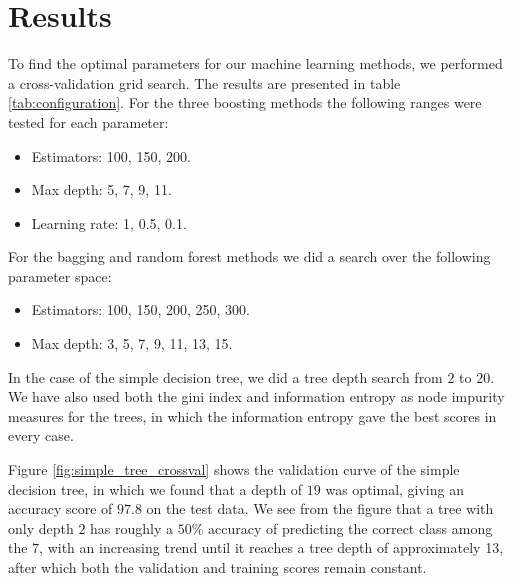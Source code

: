 \section{Results}\label{sec:Results}
To find the optimal parameters for our machine learning methods, we performed a cross-validation grid search. The results are presented in table \ref{tab:configuration}. For the three boosting methods the following ranges were tested for each parameter:

\begin{itemize}
    \item Estimators: 100, 150, 200.
    \item Max depth: 5, 7, 9, 11.
    \item Learning rate: 1, 0.5, 0.1.
\end{itemize}

For the bagging and random forest methods we did a search over the following parameter space:

\begin{itemize}
    \item Estimators: 100, 150, 200, 250, 300.
    \item Max depth: 3, 5, 7, 9, 11, 13, 15.
\end{itemize}

In the case of the simple decision tree, we did a tree depth search from $2$ to $20$. We have also used both the gini index and information entropy as node impurity measures for the trees, in which the information entropy gave the best scores in every case. 

Figure \ref{fig:simple_tree_crossval} shows the validation curve of the simple decision tree, in which we found that a depth of $19$ was optimal, giving an accuracy score of $97.8$ on the test data. We see from the figure that a tree with only depth $2$ has roughly a $50\%$ accuracy of predicting the correct class among the $7$, with an increasing trend until it reaches a tree depth of approximately 13, after which both the validation and training scores remain constant.

